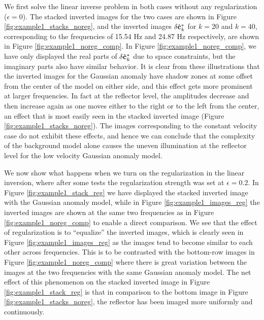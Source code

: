 \vspace*{-0.3cm}
We first solve the linear inverse problem in both cases without any regularization ($\epsilon = 0$). The stacked inverted images for the two cases are shown in Figure \ref{fig:example1_stacks_noreg}, and the inverted images $\delta \hat{\mathbf{c}}_{k}^{\ast}$ for $k=20$ and $k=40$, corresponding to the frequencies of 15.54 Hz and 24.87 Hz respectively, are shown in Figure \ref{fig:example1_noreg_comp}. In Figure \ref{fig:example1_noreg_comp}, we have only displayed the real parts of $\delta \hat{\mathbf{c}}_{k}^{\ast}$ due to space constraints, but the imaginary parts also have similar behavior. It is clear from these illustrations that the inverted images for the Gaussian anomaly have shadow zones at some offset from the center of the model on either side, and this effect gets more prominent at larger frequencies. In fact at the reflector level, the amplitudes decrease and then increase again as one moves either to the right or to the left from the center, an effect that is most easily seen in the stacked inverted image (Figure \ref{fig:example1_stacks_noreg}). The images corresponding to the constant velocity case do not exhibit these effects, and hence we can conclude that the complexity of the background model alone causes the uneven illumination at the reflector level for the low velocity Gaussian anomaly model.

\vspace*{-0.1cm}


\vspace*{-0.2cm}


\vspace*{-0.2cm}
We now show what happens when we turn on the regularization in the linear inversion, where after some tests the regularization strength was set at $\epsilon = 0.2$. In Figure \ref{fig:example1_stack_reg} we have displayed the stacked inverted image with the Gaussian anomaly model, while in Figure \ref{fig:example1_images_reg} the inverted images are shown at the same two frequencies as in Figure \ref{fig:example1_noreg_comp} to enable a direct comparison. We see that the effect of regularization is to ``equalize'' the inverted images, which is clearly seen in Figure \ref{fig:example1_images_reg} as the images tend to become similar to each other across frequencies. This is to be contrasted with the bottom-row images in Figure \ref{fig:example1_noreg_comp} where there is great variation between the images at the two frequencies with the same Gaussian anomaly model. The net effect of this phenomenon on the stacked inverted image in Figure \ref{fig:example1_stack_reg} is that in comparison to the bottom image in Figure \ref{fig:example1_stacks_noreg}, the reflector has been imaged more uniformly and continuously.

